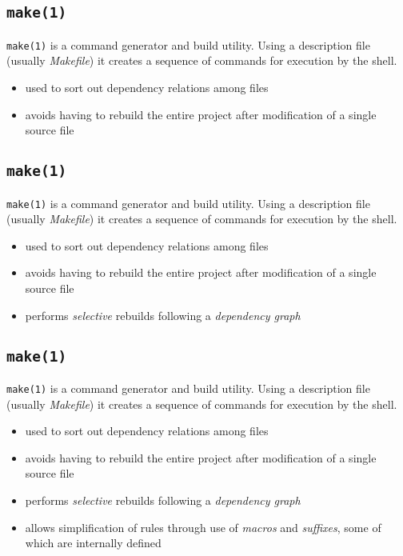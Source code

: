 \documentclass[xga]{xdvislides}
\begin{document}
\subsection{{\tt make(1)}}
{\tt make(1)} is a command generator and build utility. Using a
description file (usually {\em Makefile}) it creates a sequence of
commands for execution by the shell.

\begin{itemize}
	\item used to sort out dependency relations among files
	\item avoids having to rebuild the entire project after modification of a
		single source file
\end{itemize}

\subsection{{\tt make(1)}}
{\tt make(1)} is a command generator and build utility. Using a
description file (usually {\em Makefile}) it creates a sequence of
commands for execution by the shell.

\begin{itemize}
	\item used to sort out dependency relations among files
	\item avoids having to rebuild the entire project after modification of a
		single source file
	\item performs {\em selective} rebuilds following a {\em dependency graph}
\end{itemize}

\subsection{{\tt make(1)}}
{\tt make(1)} is a command generator and build utility. Using a
description file (usually {\em Makefile}) it creates a sequence of
commands for execution by the shell.

\begin{itemize}
	\item used to sort out dependency relations among files
	\item avoids having to rebuild the entire project after modification of a
		single source file
	\item performs {\em selective} rebuilds following a {\em dependency graph}
	\item allows simplification of rules through use of {\em macros} and {\em
		suffixes}, some of which are internally defined
\end{itemize}
\end{document}
